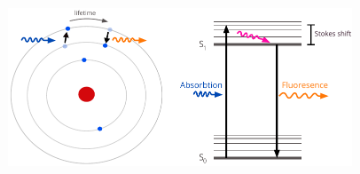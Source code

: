 \documentclass[final]{jyflluk}
\begin{document}
\begin{figure}[h]
    \begin{subfigure}[t]{0.8\textwidth}
        \centering
            \includegraphics[width=\linewidth]{images/atomm.pdf} 
            \caption{} \label{fig:atom}
        \end{subfigure}
    

\end{figure}
\end{document}
